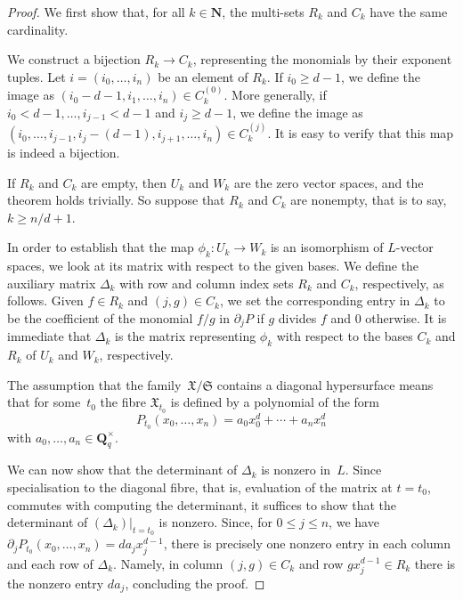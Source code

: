 \documentclass[a4paper,11pt]{article}
\numberwithin{equation}{section}
\newcommand{\NN}{\mathbf{N}} %
\newcommand{\QQ}{\mathbf{Q}} %
\renewcommand{\to}{\rightarrow}        %
\theoremstyle{definition}
\begin{document}
\begin{proof}
We first show that, for all $k \in \NN$, the multi-sets $R_k$ and $C_k$ 
have the same cardinality.

We construct a bijection $R_k \to C_k$, representing the 
monomials by their exponent tuples.  Let $i = (i_0, \dotsc, i_n)$ be an
element of $R_k$.  If $i_0 \geq d-1$, we define the image as
$(i_0-d-1, i_1, \dotsc, i_n) \in C_k^{(0)}$.  More generally, if 
$i_0 < d-1, \dotsc, i_{j-1} < d-1$ and $i_j \geq d-1$, we define the image as 
$(i_0, \dotsc, i_{j-1}, i_j-(d-1), i_{j+1}, \dotsc, i_n) \in C_k^{(j)}$.  
It is easy to verify that this map is indeed a bijection.

If $R_k$ and $C_k$ are empty, then $U_k$ and $W_k$ are the zero vector spaces, and
the theorem holds trivially. So suppose that $R_k$ and $C_k$ are nonempty, that is to
say, $k \geq n/d + 1$.

In order to establish that the map $\phi_k \colon U_k \to W_k$ is an 
isomorphism of $L$-vector spaces, we look at its matrix with respect to 
the given bases.   We define the auxiliary matrix $\Delta_k$ with 
row and column index sets $R_k$ and $C_k$, respectively, as follows.  
Given $f \in R_k$ and $(j,g) \in C_k$, we set the corresponding entry in 
$\Delta_k$ to be the coefficient of the monomial $f/g$ in $\partial_j P$ if 
$g$ divides $f$ and $0$ otherwise. It is immediate that $\Delta_k$ is the 
matrix representing $\phi_k$ with respect to the bases $C_k$ and $R_k$ of 
$U_k$ and $W_k$, respectively.

The assumption that the family~$\mathfrak{X}/\mathfrak{S}$ contains a diagonal 
hypersurface means that for some~$t_0$ the fibre $\mathfrak{X}_{t_0}$ is 
defined by a polynomial of the form 
\begin{equation*}
P_{t_0}(x_0, \dotsc, x_n) = a_0 x_0^d + \dotsb + a_n x_n^d
\end{equation*}
with $a_0, \dotsc, a_n \in \QQ_q^{\times}$.

We can now show that the determinant of $\Delta_k$ is nonzero in~$L$.  Since 
specialisation to the diagonal fibre, that is, evaluation of the matrix at 
$t = t_0$, commutes with computing the determinant, it suffices to show that 
the determinant of $(\Delta_k) \big |_{t=t_0}$ is nonzero.  Since, for 
$0 \leq j \leq n$, we have $\partial_j P_{t_0} (x_0, \dotsc, x_n) = d a_j x_j^{d-1}$, 
there is precisely one nonzero entry in each column and each row of $\Delta_k$.  
Namely, in column $(j, g) \in C_k$ and row $g x_j^{d-1} \in R_k$ there is the 
nonzero entry $d a_j$, concluding the proof.
\end{proof}
\end{document}
